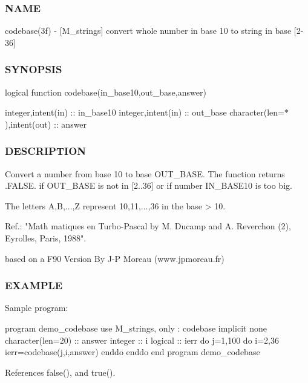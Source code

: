 \subsubsection*{N\+A\+ME}

codebase(3f) -\/ \mbox{[}M\+\_\+strings\mbox{]} convert whole number in base 10 to string in base \mbox{[}2-\/36\mbox{]}

\subsubsection*{S\+Y\+N\+O\+P\+S\+IS}

logical function codebase(in\+\_\+base10,out\+\_\+base,answer)

integer,intent(in) \+:\+: in\+\_\+base10 integer,intent(in) \+:\+: out\+\_\+base character(len=$\ast$),intent(out) \+:\+: answer

\subsubsection*{D\+E\+S\+C\+R\+I\+P\+T\+I\+ON}

\begin{DoxyVerb}Convert a number from base 10 to base OUT_BASE. The function returns
.FALSE. if OUT_BASE is not in [2..36] or if number IN_BASE10 is
too big.

The letters A,B,...,Z represent 10,11,...,36 in the base > 10.

   Ref.: "Math matiques en Turbo-Pascal by
          M. Ducamp and A. Reverchon (2),
          Eyrolles, Paris, 1988".

based on a F90 Version By J-P Moreau (www.jpmoreau.fr)
\end{DoxyVerb}


\subsubsection*{E\+X\+A\+M\+P\+LE}

Sample program\+:

program demo\+\_\+codebase use M\+\_\+strings, only \+: codebase implicit none character(len=20) \+:\+: answer integer \+:\+: i logical \+:\+: ierr do j=1,100 do i=2,36 ierr=codebase(j,i,answer) enddo enddo end program demo\+\_\+codebase 

References false(), and true().

\mbox{\label{namespacem__strings_a929c032267cb990ad4991fab4aed1d57}} 
